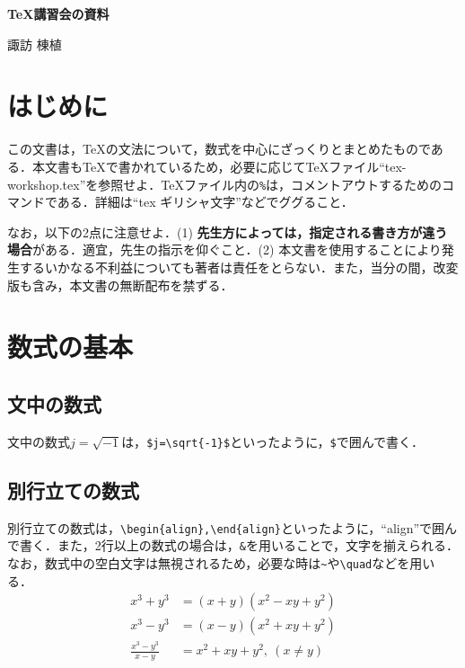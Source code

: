 \documentclass[11pt,a4paper]{jsarticle}
\begin{document}
\begin{center}
  {\Large\bfseries \TeX 講習会の資料} %
\end{center}
\begin{flushright}
  {\large 諏訪 棟植} %
\end{flushright}
%
%
\section{はじめに}

この文書は，\TeX の文法について，数式を中心にざっくりとまとめたものである．本文書も\TeX で書かれているため，必要に応じて\TeX ファイル``tex-workshop.tex''を参照せよ．TeXファイル内の\verb|%|は，コメントアウトするためのコマンドである．詳細は``tex ギリシャ文字''などでググること．

なお，以下の2点に注意せよ．(1) \textbf{先生方によっては，指定される書き方が違う場合}がある．適宜，先生の指示を仰ぐこと．(2) 本文書を使用することにより発生するいかなる不利益についても著者は責任をとらない．また，当分の間，改変版も含み，本文書の無断配布を禁ずる．

\section{数式の基本}

\subsection{文中の数式}

文中の数式$j=\sqrt{-1}$は，\verb|$j=\sqrt{-1}$|といったように，\verb|$|で囲んで書く．

\subsection{別行立ての数式}

別行立ての数式は，\verb|\begin{align},\end{align}|といったように，``align''で囲んで書く．また，2行以上の数式の場合は，\verb|&|を用いることで，文字を揃えられる．なお，数式中の空白文字は無視されるため，必要な時は\verb|~|や\verb|\quad|などを用いる．
\begin{align}
  x^3+y^3             & =(x+y)\left(x^2-xy+y^2\right) \label{factorization-1} \\
  x^3-y^3             & =(x-y)\left(x^2+xy+y^2\right) \label{factorization-2} \\
  \frac{x^3-y^3}{x-y} & =x^2+xy+y^2,~(x\neq y) \label{factorization-3}
\end{align}
\end{document}
